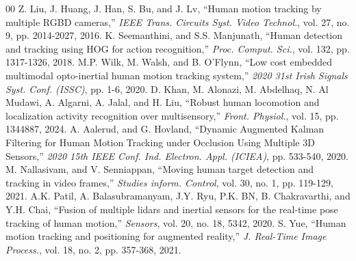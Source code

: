 \documentclass[conference]{IEEEtran}
\begin{document}
\begin{thebibliography}{00}
 Z. Liu, J. Huang, J. Han, S. Bu, and J. Lv, ``Human motion tracking by multiple RGBD cameras,'' \textit{IEEE Trans. Circuits Syst. Video Technol.}, vol. 27, no. 9, pp. 2014-2027, 2016.
 K. Seemanthini, and S.S. Manjunath, ``Human detection and tracking using HOG for action recognition,'' \textit{Proc. Comput. Sci.}, vol. 132, pp. 1317-1326, 2018.
 M.P. Wilk, M. Walsh, and B. O'Flynn, ``Low cost embedded multimodal opto-inertial human motion tracking system,'' \textit{2020 31st Irish Signals Syst. Conf. (ISSC)}, pp. 1-6, 2020.
 D. Khan, M. Alonazi, M. Abdelhaq, N. Al Mudawi, A. Algarni, A. Jalal, and H. Liu, ``Robust human locomotion and localization activity recognition over multisensory,'' \textit{Front. Physiol.}, vol. 15, pp. 1344887, 2024.
 A. Aalerud, and G. Hovland, ``Dynamic Augmented Kalman Filtering for Human Motion Tracking under Occlusion Using Multiple 3D Sensors,'' \textit{2020 15th IEEE Conf. Ind. Electron. Appl. (ICIEA)}, pp. 533-540, 2020.
 M. Nallasivam, and V. Senniappan, ``Moving human target detection and tracking in video frames,'' \textit{Studies inform. Control}, vol. 30, no. 1, pp. 119-129, 2021.
 A.K. Patil, A. Balasubramanyam, J.Y. Ryu, P.K. BN, B. Chakravarthi, and Y.H. Chai, ``Fusion of multiple lidars and inertial sensors for the real-time pose tracking of human motion,'' \textit{Sensors}, vol. 20, no. 18, 5342, 2020.
 S. Yue, ``Human motion tracking and positioning for augmented reality,'' \textit{J. Real-Time Image Process.}, vol. 18, no. 2, pp. 357-368, 2021.
\end{thebibliography}
\end{document}
